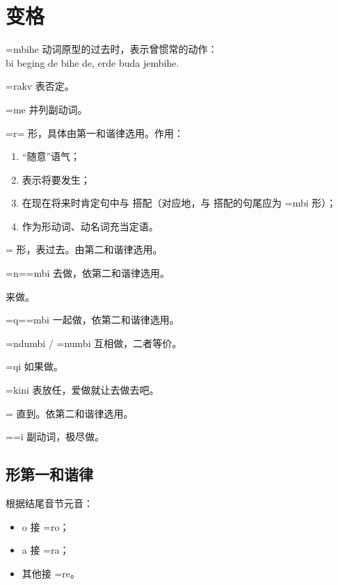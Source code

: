 \pagebreak

\section{变格}

\begin{des}
    \item[\V=mbihe] 动词原型的过去时，表示曾惯常的动作：\\
        bi beging de bihe  de,  erde buda jembihe.
    \item[\V=rakv ] 表否定。
    \item[\V=me] 并列副动词。
    \item[\V=r=\AIfina]  形，具体由第一和谐律选用。作用：
        \begin{enumerate}
            \item “随意”语气；
            \item 表示将要发生；
            \item 在现在将来时肯定句中与  搭配（对应地，与  搭配的句尾应为 =mbi 形）；
            \item 作为形动词、动名词充当定语。
        \end{enumerate}
    \item[\V=\HAfina] 形，表过去。由第二和谐律选用。
    \item[\V=n=\AIImedi=mbi] 去做\V  ，依第二和谐律选用。
    \item[\V \bil{='jimbi}{\lat{-njimbi}}] 来做\V 。
    \item[\V=q=\AIImedi=mbi] 一起做，依第二和谐律选用。
    \item[\V=ndumbi / \V=numbi] 互相做\V ，二者等价。
    \item[\V=qi] 如果做\V。
    \item[\V=kini] 表放任，爱做\V 就让去做去吧。 
    \item[\V=\red{=t=\AIIfina}] 直到。依第二和谐律选用。
    \item[\V=\red{=t=\AIImedi}=i] 副动词，极尽做\V 。
\end{des}

\subsection{形第一和谐律}

根据\V 结尾音节元音：

\begin{itemize}
    \item o 接 =ro；
    \item a 接 =ra；
    \item 其他接 =re。
\end{itemize}


